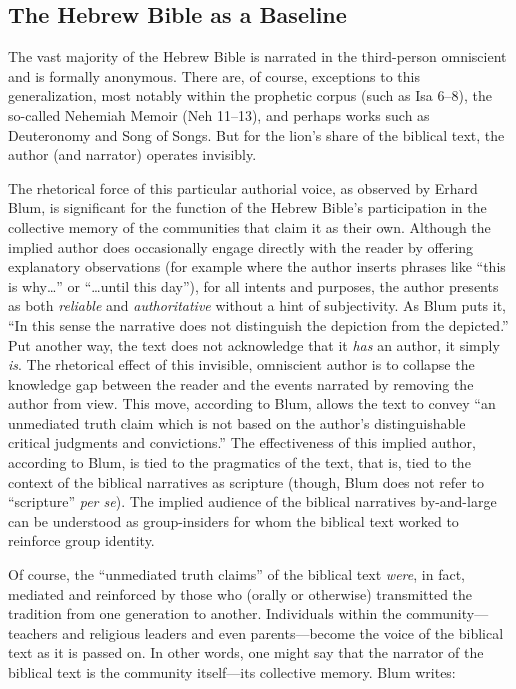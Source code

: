 \subsection{The Hebrew Bible as a Baseline}

The vast majority of the Hebrew Bible is narrated in the third-person omniscient and is formally anonymous. There are, of course, exceptions to this generalization, most notably within the prophetic corpus (such as Isa 6--8), the so-called Nehemiah Memoir (Neh 11--13), and perhaps works such as Deuteronomy and Song of Songs. But for the lion's share of the biblical text, the author (and narrator) operates invisibly.

The rhetorical force of this particular authorial voice, as observed by Erhard Blum, is significant for the function of the Hebrew Bible's participation in the collective memory of the communities that claim it as their own. Although the implied author does occasionally engage directly with the reader by offering explanatory observations (for example where the author inserts phrases like ``this is why\ldots{}'' or ``\ldots{}until this day''), for all intents and purposes, the author presents as both \emph{reliable} and \emph{authoritative} without a hint of subjectivity. As Blum puts it, ``In this sense the narrative does not distinguish the depiction from the depicted.''\autocite[33]{blum_barton-etal2007} Put another way, the text does not acknowledge that it \emph{has} an author, it simply \emph{is}. The rhetorical effect of this invisible, omniscient author is to collapse the knowledge gap between the reader and the events narrated by removing the author from view. This move, according to Blum, allows the text to convey ``an unmediated truth claim which is not based on the author's distinguishable critical judgments and convictions.''\autocite[33]{blum_barton-etal2007} The effectiveness of this implied author, according to Blum, is tied to the pragmatics of the text, that is, tied to the context of the biblical narratives as scripture (though, Blum does not refer to ``scripture'' \emph{per se}). The implied audience of the biblical narratives by-and-large can be understood as group-insiders for whom the biblical text worked to reinforce group identity.

Of course, the ``unmediated truth claims'' of the biblical text \emph{were}, in fact, mediated and reinforced by those who (orally or otherwise) transmitted the tradition from one generation to another.\autocite[33]{blum_barton-etal2007} Individuals within the community---teachers and religious leaders and even parents---become the voice of the biblical text as it is passed on. In other words, one might say that the narrator of the biblical text is the community itself---its collective memory. Blum writes:

